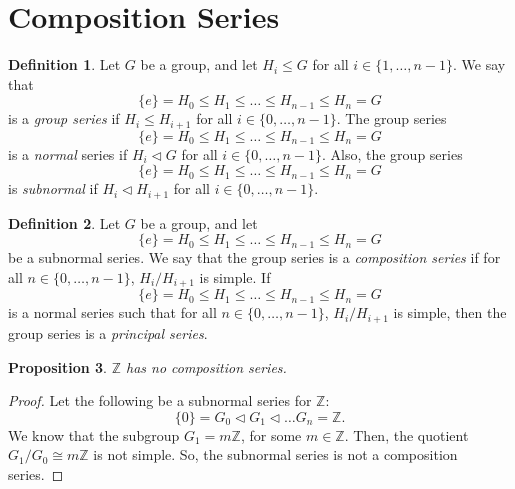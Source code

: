 \documentclass[a4paper, openany]{memoir}
\theoremstyle{definition}
\newtheorem{definition}{Definition}[section]
\theoremstyle{plain}
\newtheorem{proposition}[definition]{Proposition}
\begin{document}
    \section{Composition Series}
    \begin{definition}
        Let $G$ be a group, and let $H_i \leq G$ for all $i \in \{1, \dots, n-1\}$. We say that 
        \[\{e\} = H_0 \leq H_1 \leq \dots \leq H_{n-1} \leq H_n = G\]
        is a \emph{group series} if $H_i \leq H_{i+1}$ for all $i \in \{0, \dots, n-1\}$. The group series
        \[\{e\} = H_0 \leq H_1 \leq \dots \leq H_{n-1} \leq H_n = G\]
        is a \emph{normal} series if $H_i \vartriangleleft G$ for all $i \in \{0, \dots, n-1\}$. Also, the group series
        \[\{e\} = H_0 \leq H_1 \leq \dots \leq H_{n-1} \leq H_n = G\]
        is \emph{subnormal} if $H_i \vartriangleleft H_{i+1}$ for all $i \in \{0, \dots, n-1\}$.
    \end{definition}

    \begin{definition}
        Let $G$ be a group, and let 
        \[\{e\} = H_0 \leq H_1 \leq \dots \leq H_{n-1} \leq H_n = G\]
        be a subnormal series. We say that the group series is a \emph{composition series} if for all $n \in \{0, \dots, n-1\}$, $H_i/H_{i+1}$ is simple. If 
        \[\{e\} = H_0 \leq H_1 \leq \dots \leq H_{n-1} \leq H_n = G\]
        is a normal series such that for all $n \in \{0, \dots, n-1\}$, $H_i/H_{i+1}$ is simple, then the group series is a \emph{principal series}.
    \end{definition}

    \begin{proposition}
        $\mathbb{Z}$ has no composition series.
    \end{proposition}
    \begin{proof}
        Let the following be a subnormal series for $\mathbb{Z}$:
        \[\{0\} = G_0 \vartriangleleft G_1 \vartriangleleft \dots G_n = \mathbb{Z}.\]
        We know that the subgroup $G_1 = m\mathbb{Z}$, for some $m \in \mathbb{Z}$. Then, the quotient $G_1/G_0 \cong m\mathbb{Z}$ is not simple. So, the subnormal series is not a composition series.
    \end{proof}
\end{document}
